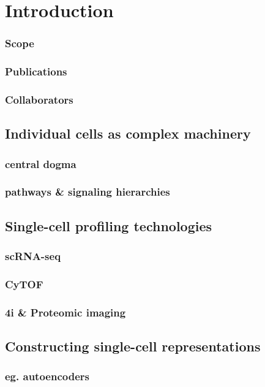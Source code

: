 \chapter{Introduction}
\subsection{Scope}
\subsection{Publications}
\subsection{Collaborators}

\section{Individual cells as complex machinery}
\subsection{central dogma}
\subsection{pathways \& signaling hierarchies}
\section{ Single-cell profiling technologies}
\subsection{scRNA-seq}
\subsection{CyTOF}
\subsection{4i \& Proteomic imaging}

\section{Constructing single-cell representations}
\subsection{eg. autoencoders}

